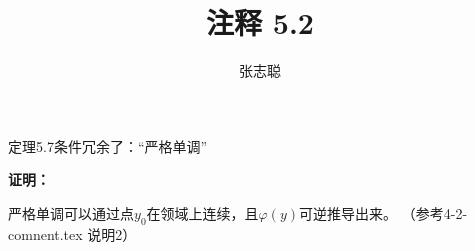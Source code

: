 \documentclass{article}
\begin{document}
\title{注释 5.2}
\author{张志聪}
\maketitle
\begin{zremark}
  定理5.7条件冗余了：“严格单调”
\end{zremark}

\textbf{证明：}

严格单调可以通过点$y_0$在领域上连续，且$\varphi(y)$可逆推导出来。
（参考4-2-comnent.tex 说明2）
\end{document}
